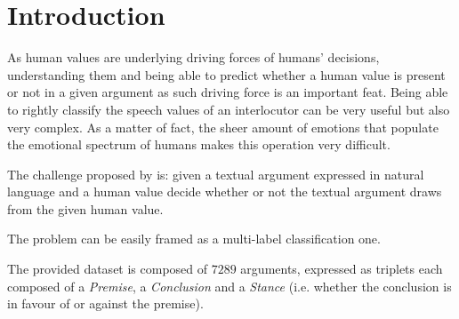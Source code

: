 \documentclass[11pt]{article}
\begin{document}


\section{Introduction}
\label{sec:introduction}
As human values are underlying driving forces of humans' decisions, understanding them and being able to predict whether a human value is present or not in a given argument as such driving force is an important feat.
Being able to rightly classify the speech values of an interlocutor can be very useful but also very complex.
As a matter of fact, the sheer amount of emotions that populate the emotional spectrum of humans makes this operation very difficult.

The challenge proposed by \cite{Kiesel2022} is: given a textual argument expressed in natural language and a human value decide whether or not the textual argument draws from the given human value.

The problem can be easily framed as a multi-label classification one.

The provided dataset is composed of $7289$ arguments, expressed as triplets each composed of a \textit{Premise}, a \textit{Conclusion} and a \textit{Stance} (i.e. whether the conclusion is in favour of or against the premise).
\end{document}
